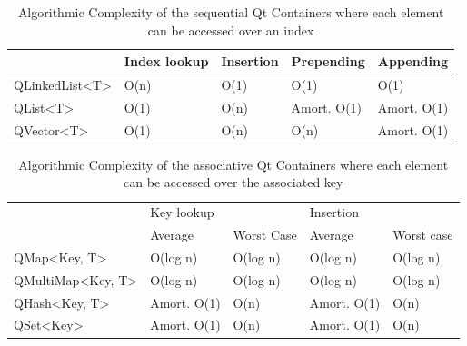 \begin{table}[!htb]
\centering

\begin{tabular}{@{}|l|l|l|l|l|@{}}
\toprule
                                  & Index lookup & Insertion & Prepending  & Appending   \\ \midrule
QLinkedList\textless T\textgreater & O(n)         & O(1)      & O(1)        & O(1)        \\ \midrule
QList\textless T\textgreater       & O(1)         & O(n)      & Amort. O(1) & Amort. O(1) \\ \midrule
QVector\textless T\textgreater     & O(1)         & O(n)      & O(n)        & Amort. O(1) \\ \bottomrule
\end{tabular}
\caption{Algorithmic Complexity of the sequential Qt Containers where each element can be accessed over an index \cite{QtDoc:Containers}}
\label{tab:qt-container-sequential}
\end{table}

\begin{table}[!htb]

\centering
\begin{tabular}{@{}|l|l|l|l|l|@{}}
\toprule

\multirow{2}{*}{}                    & \multicolumn{2}{l|}{Key lookup} & \multicolumn{2}{l|}{Insertion} \\ \cmidrule(l){2-5} 
                                     & Average         & Worst Case    & Average        & Worst case    \\ \midrule
QMap\textless Key, T\textgreater      & O(log n)        & O(log n)      & O(log n)       & O(log n)      \\ \midrule
QMultiMap\textless Key, T\textgreater & O(log n)        & O(log n)      & O(log n)       & O(log n)      \\ \midrule
QHash\textless Key, T\textgreater     & Amort. O(1)     & O(n)          & Amort. O(1)    & O(n)          \\ \midrule
QSet\textless Key\textgreater         & Amort. O(1)     & O(n)          & Amort. O(1)    & O(n)          \\ \bottomrule
\end{tabular}
\caption{Algorithmic Complexity of the associative Qt Containers where each element can be accessed over the associated key \cite{QtDoc:Containers}}
\label{tab:qt-container-associative}
\end{table}

